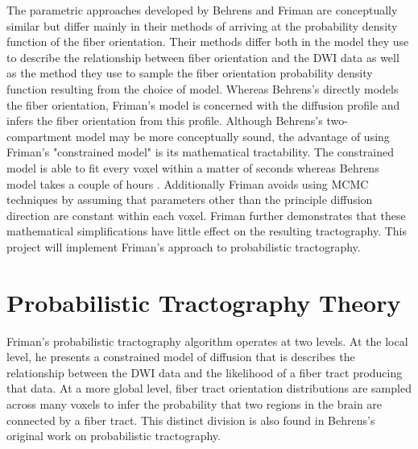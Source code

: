 The parametric approaches developed by Behrens and Friman are conceptually similar but differ mainly in their methods of arriving at the probability density function of the fiber orientation.  Their methods differ both in the model they use to describe the relationship between fiber orientation and the DWI data as well as the method they use to sample the fiber orientation probability density function resulting from the choice of model.  Whereas Behrens's directly models the fiber orientation, Friman's model is concerned with the diffusion profile and infers the fiber orientation from this profile.  Although Behrens's two-compartment model may be more conceptually sound, the advantage of using Friman's "constrained model" is its mathematical tractability.  The constrained model is able to fit every voxel within a matter of seconds whereas Behrens model takes a couple of hours \cite{frimanTMI06}.  Additionally Friman avoids using MCMC techniques by assuming that parameters other than the principle diffusion direction are constant within each voxel.  Friman further demonstrates that these mathematical simplifications have little effect on the resulting tractography.  This project will implement Friman's approach to probabilistic tractography.

\section{Probabilistic Tractography Theory}

Friman's probabilistic tractography algorithm \cite{frimanTMI06} operates at two levels.  At the local level, he presents a constrained model of diffusion that is describes the relationship between the DWI data and the likelihood of a fiber tract producing that data.  At a more global level, fiber tract orientation distributions are sampled across many voxels to infer the probability that two regions in the brain are connected by a fiber tract.  This distinct division is also found in Behrens's original work \cite{behrensMRM03} on probabilistic tractography.

